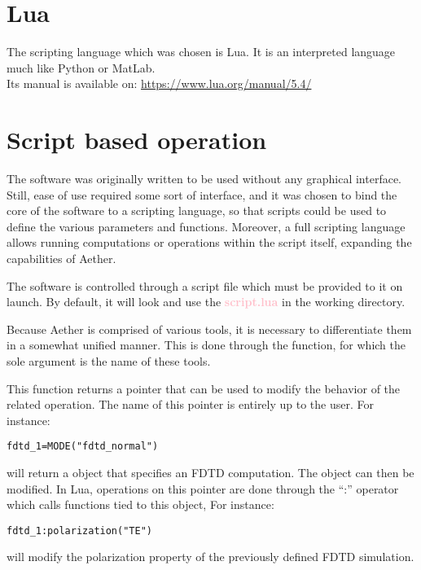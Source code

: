 \documentclass[a4paper,11pt]{book}
\newcommand{\fwarn}{\ifthenelse{\boolean{warnings}}{\errmessage{Completion}}{}}
\newcommand{\lfc}[1]{\textbf{\color{blue}{#1}}}
\newcommand{\lsgnq}[1]{\textbf{\textcolor{pink}{#1}}}
\begin{document}
\section{Lua}

The scripting language which was chosen is Lua. It is an interpreted language much like Python or MatLab.\\ Its manual is available on: \url{https://www.lua.org/manual/5.4/}

%
%
%

\section{Script based operation}

The software was originally written to be used without any graphical interface. Still, ease of use required some sort of interface, and it was chosen to bind the core of the software to a scripting language, so that scripts could be used to define the various parameters and functions. Moreover, a full scripting language allows running computations or operations within the script itself, expanding the capabilities of Aether.

The software is controlled through a script file which must be provided to it on launch. By default, it will look and use the \lsgnq{script.lua} in the working directory.

Because Aether is comprised of various tools, it is necessary to differentiate them in a somewhat unified manner. This is done through the \lfc{MODE} function, for which the sole argument is the name of these tools.

This function returns a pointer that can be used to modify the behavior of the related operation. The name of this pointer is entirely up to the user. For instance:
\begin{lstlisting}
fdtd_1=MODE("fdtd_normal")
\end{lstlisting}
will return a object that specifies an FDTD computation. The object can then be modified. In Lua, operations on this pointer are done through the ``:'' operator which calls functions tied to this object, For instance:
\begin{lstlisting}
fdtd_1:polarization("TE")
\end{lstlisting}
will modify the polarization property of the previously defined FDTD simulation.
\end{document}
